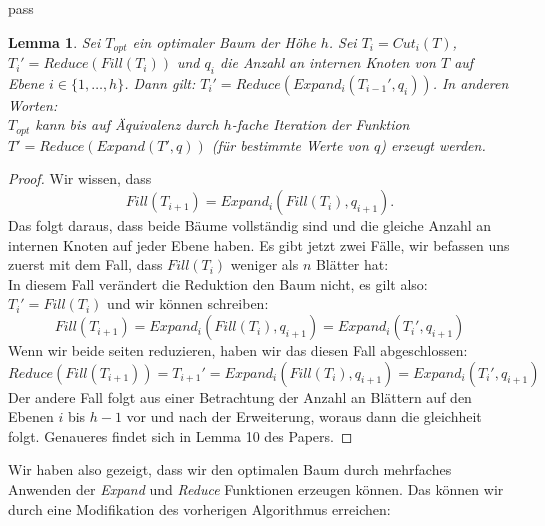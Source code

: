 pass\documentclass[a4paper,10pt,ngerman]{scrartcl}
\newtheorem{lemma}[satz]{Lemma}
\begin{document}
    \begin{lemma}
        Sei $T_{opt}$ ein optimaler Baum der Höhe $h$.
        Sei $T_i = Cut_i(T)$, $T_i' = Reduce(Fill(T_i))$ und $q_i$ die Anzahl an internen Knoten von $T$ auf Ebene $i \in \{1, \dots, h\}$.
        Dann gilt: $T_i' = Reduce(Expand_i(T_{i-1}', q_i))$.
        In anderen Worten: \\
        $T_{opt}$ kann bis auf Äquivalenz durch $h$-fache Iteration der Funktion $T' = Reduce(Expand(T',q))$ (für bestimmte Werte von $q$) erzeugt werden.
    \end{lemma}
    \begin{proof}
        Wir wissen, dass
        \[Fill(T_{i+1}) = Expand_i(Fill(T_i), q_{i+1}).\]
        Das folgt daraus, dass beide Bäume vollständig sind und die gleiche Anzahl an internen Knoten auf jeder Ebene haben.
        Es gibt jetzt zwei Fälle, wir befassen uns zuerst mit dem Fall, dass $Fill(T_i)$ weniger als $n$ Blätter hat: \\
        In diesem Fall verändert die Reduktion den Baum nicht, es gilt also: $T_i' = Fill(T_i)$ und wir können schreiben:
        \[Fill(T_{i+1}) = Expand_i(Fill(T_i), q_{i+1}) = Expand_i(T_i', q_{i+1})\]
        Wenn wir beide seiten reduzieren, haben wir das diesen Fall abgeschlossen:
        \[Reduce(Fill(T_{i+1})) = T_{i+1}' = Expand_i(Fill(T_i), q_{i+1}) = Expand_i(T_i', q_{i+1})\]
        Der andere Fall folgt aus einer Betrachtung der Anzahl an Blättern auf den Ebenen $i$ bis $h-1$ vor und nach der Erweiterung, woraus dann die gleichheit folgt.
        Genaueres findet sich in Lemma 10 des Papers\autocite{golin_dynamic_1998}.
    \end{proof}
    Wir haben also gezeigt, dass wir den optimalen Baum durch mehrfaches Anwenden der \textit{Expand} und \textit{Reduce} Funktionen erzeugen können.
    Das können wir durch eine Modifikation des vorherigen Algorithmus erreichen:
\end{document}
